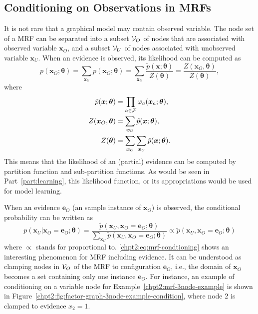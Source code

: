 \subsection{Conditioning on Observations in MRFs}
It is not rare that a graphical model may contain observed variable. The node set of a MRF can be separated into a subset $\mathcal{V}_O$ of nodes that are associated with observed variable $\bm{x}_O$, and a subset $\mathcal{V}_U$ of nodes associated with unobserved variable $\bm{x}_U$. When an evidence is observed, its likelihood can be computed as
\begin{equation}
  p(\bm{x}_O;\bm{\theta}) = \sum_{\bm{x}_U} p(\bm{x}_O;\bm{\theta}) =\sum_{\bm{x}_U}\frac{\tilde{p}(\bm{x}; \bm{\theta})}{Z(\bm{\theta})} = \frac{Z(\bm{x}_O,\bm{\theta})}{Z(\bm{\theta})},
\end{equation}
where 
\begin{align}
  \tilde{p}(\bm{x}; \bm{\theta}) &= \prod_{a \in \mathcal{F}} \varphi_{a}(\bm{x}_{a};\bm{\theta}), \nonumber \\
  Z(\bm{x}_O, \bm{\theta}) &= \sum_{\bm{x}_U} \tilde{p}(\bm{x}; \bm{\theta}), \nonumber \\
  Z(\bm{\theta}) &= \sum_{\bm{x}_O}\sum_{\bm{x}_U} \tilde{p}(\bm{x}; \bm{\theta}).
\end{align}
This means that the likelihood of an (partial) evidence can be computed by partition function and sub-partition functions. As would be seen in Part~\ref{part:learning}, this likelihood function, or its appropriations would be used for model learning.

 When an evidence $\bm{e}_O$ (an sample instance of $\bm{x}_O$) is observed, the conditional probability can be written as
\begin{equation}\label{chpt2:eq:mrf-condtioning}
  p(\bm{x}_U|\bm{x}_O=\bm{e}_O;\bm{\theta}) = \frac{\tilde{p}(\bm{x}_U, \bm{x}_O = \bm{e}_O; \bm{\theta})}{\sum_{\bm{x}_U}\tilde{p}(\bm{x}_U, \bm{x}_O = \bm{e}_O; \bm{\theta})} \propto \tilde{p}(\bm{x}_U, \bm{x}_O = \bm{e}_O; \bm{\theta})
\end{equation}
where $\propto$ stands for proportional to. \eqref{chpt2:eq:mrf-condtioning} shows an interesting phenomenon for MRF including evidence. It can be understood as clamping nodes in $\mathcal{V}_O$ of the MRF to configuration $\bm{e}_O$, i.e., the domain of $\bm{x}_O$ becomes a set containing only one instance $\bm{e}_O$. For instance, an example of conditioning on a variable node for Example~\ref{chpt2:mrf-3node-example} is shown in Figure~\ref{chpt2:fig:factor-graph-3node-example-condition}, where node $2$ is clamped to evidence $x_2=1$.



